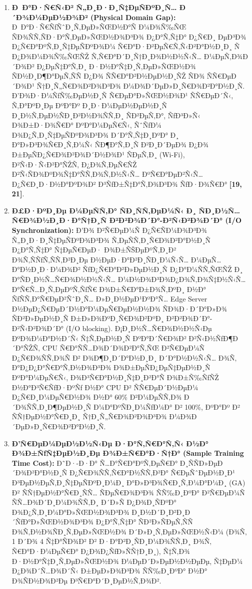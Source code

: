 \documentclass[]{article}
\begin{document}
\begin{enumerate}
\def\labelenumi{\arabic{enumi}.}
\item
  \textbf{Ð Ð°Ð·Ñ€Ñ‹Ð² Ñ„Ð¸Ð·Ð¸Ñ‡ÐµÑÐºÐ¸Ñ… Ð´Ð¾Ð¼ÐµÐ½Ð¾Ð² (Physical Domain Gap):} Ð Ð°Ð·Ñ€ÑƒÑˆÐ¸Ñ‚ÐµÐ»ÑŒÐ½Ð°Ñ Ð¼Ð¾Ñ‰ÑŒ ÑÐ¾ÑÑ‚ÑÐ·Ð°Ñ‚ÐµÐ»ÑŒÐ½Ð¾Ð³Ð¾ Ð¿Ð°Ñ‚Ñ‡Ð° Ð¿Ñ€Ð¸ ÐµÐ³Ð¾ Ð¿Ñ€Ð°ÐºÑ‚Ð¸Ñ‡ÐµÑÐºÐ¾Ð¼ Ñ€Ð°Ð·Ð²ÐµÑ€Ñ‚Ñ‹Ð²Ð°Ð½Ð¸Ð¸ Ñ Ð¿Ð¾Ð¼Ð¾Ñ‰ÑŒÑŽ Ñ‚Ñ€Ð°Ð´Ð¸Ñ†Ð¸Ð¾Ð½Ð½Ñ‹Ñ… Ð¼ÐµÑ‚Ð¾Ð´Ð¾Ð² Ð¿ÐµÑ‡Ð°Ñ‚Ð¸ Ð·Ð½Ð°Ñ‡Ð¸Ñ‚ÐµÐ»ÑŒÐ½Ð¾ ÑÐ½Ð¸Ð¶Ð°ÐµÑ‚ÑÑ Ð¿Ð¾ ÑÑ€Ð°Ð²Ð½ÐµÐ½Ð¸ÑŽ ÑÐ¾ ÑÑ€ÐµÐ´Ð¾Ð¹ Ñ†Ð¸Ñ„Ñ€Ð¾Ð²Ð¾Ð³Ð¾ Ð¼Ð¾Ð´ÐµÐ»Ð¸Ñ€Ð¾Ð²Ð°Ð½Ð¸Ñ. Ð’Ð¾Ð·Ð¼ÑƒÑ‰ÐµÐ½Ð¸Ñ Ñ€ÐµÐ°Ð»ÑŒÐ½Ð¾Ð¹ ÑÑ€ÐµÐ´Ñ‹, Ñ‚Ð°ÐºÐ¸Ðµ ÐºÐ°Ðº Ð¸Ð·Ð¼ÐµÐ½ÐµÐ½Ð¸Ñ Ð¸Ð½Ñ‚ÐµÐ½ÑÐ¸Ð²Ð½Ð¾ÑÑ‚Ð¸ ÑÐ²ÐµÑ‚Ð°, ÑƒÐ³Ð»Ñ‹ Ð¾Ð±Ð·Ð¾Ñ€Ð° ÐºÐ°Ð¼ÐµÑ€Ñ‹, ÑˆÑƒÐ¼ Ð¾Ð¿Ñ‚Ð¸Ñ‡ÐµÑÐºÐ¾Ð³Ð¾ Ð´Ð°Ñ‚Ñ‡Ð¸ÐºÐ° Ð¸ Ð°Ð»Ð³Ð¾Ñ€Ð¸Ñ‚Ð¼Ñ‹ ÑÐ¶Ð°Ñ‚Ð¸Ñ Ð²Ð¸Ð´ÐµÐ¾ Ð¿Ð¾ Ð±ÐµÑÐ¿Ñ€Ð¾Ð²Ð¾Ð´Ð½Ð¾Ð¹ ÑÐµÑ‚Ð¸ (Wi-Fi), Ð²Ñ‹Ð·Ñ‹Ð²Ð°ÑŽÑ‚ Ð¿Ð¾Ñ‚ÐµÑ€ÑŽ Ð²Ñ‹ÑÐ¾ÐºÐ¾Ñ‡Ð°ÑÑ‚Ð¾Ñ‚Ð½Ñ‹Ñ… ÐºÑ€Ð°ÐµÐ²Ñ‹Ñ… Ð¿Ñ€Ð¸Ð·Ð½Ð°ÐºÐ¾Ð² Ð³ÑƒÐ±Ñ‡Ð°Ñ‚Ð¾Ð³Ð¾ ÑƒÐ·Ð¾Ñ€Ð° \textbf{{[}19, 21{]}}.
\item
  \textbf{Ð£Ð·ÐºÐ¸Ðµ Ð¼ÐµÑÑ‚Ð° ÑÐ¸ÑÑ‚ÐµÐ¼Ñ‹ Ð¸ ÑÐ¸Ð½Ñ…Ñ€Ð¾Ð½Ð¸Ð·Ð°Ñ†Ð¸Ñ Ð²Ð²Ð¾Ð´Ð°-Ð²Ñ‹Ð²Ð¾Ð´Ð° (I/O Synchronization):} Ð’Ð¾ Ð²Ñ€ÐµÐ¼Ñ Ð¿Ñ€ÑÐ¼Ð¾Ð³Ð¾ Ñ„Ð¸Ð·Ð¸Ñ‡ÐµÑÐºÐ¾Ð³Ð¾ Ñ‚ÐµÑÑ‚Ð¸Ñ€Ð¾Ð²Ð°Ð½Ð¸Ñ Ð¿Ð°Ñ‚Ñ‡Ð° Ñ‡ÐµÑ€ÐµÐ· Ð¾Ð±ÑŠÐµÐºÑ‚Ð¸Ð² Ð¾Ñ‚ÑÑƒÑ‚ÑÑ‚Ð²Ð¸Ðµ Ð½ÐµÐ·Ð°Ð²Ð¸ÑÐ¸Ð¼Ñ‹Ñ… Ð¼ÐµÑ…Ð°Ð½Ð¸Ð·Ð¼Ð¾Ð² ÑƒÐ¿Ñ€Ð°Ð²Ð»ÐµÐ½Ð¸Ñ Ð¿Ð°Ð¼ÑÑ‚ÑŒÑŽ Ð¸ Ð°ÑÐ¸Ð½Ñ…Ñ€Ð¾Ð½Ð½Ñ‹Ñ… Ð¼Ð½Ð¾Ð³Ð¾Ð¿Ð¾Ñ‚Ð¾Ñ‡Ð½Ñ‹Ñ… Ð°Ñ€Ñ…Ð¸Ñ‚ÐµÐºÑ‚ÑƒÑ€ Ð¾Ð±Ñ€Ð°Ð±Ð¾Ñ‚ÐºÐ¸ Ð½Ð° ÑƒÑÑ‚Ð°Ñ€ÐµÐ²ÑˆÐ¸Ñ… Ð»Ð¸Ð½ÐµÐ¹ÐºÐ°Ñ… Edge Server Ð½ÐµÐ¿Ñ€ÐµÐ´Ð½Ð°Ð¼ÐµÑ€ÐµÐ½Ð½Ð¾ ÑÐ¾Ð·Ð´Ð°Ð»Ð¾ ÑÐ²Ð»ÐµÐ½Ð¸Ñ Ð±Ð»Ð¾ÐºÐ¸Ñ€Ð¾Ð²ÐºÐ¸ Ð²Ð²Ð¾Ð´Ð°-Ð²Ñ‹Ð²Ð¾Ð´Ð° (I/O blocking). Ð¡Ð¸Ð½Ñ…Ñ€Ð¾Ð½Ð½Ñ‹Ðµ ÐºÐ¾Ð¼Ð°Ð½Ð´Ñ‹ Ñ‡Ñ‚ÐµÐ½Ð¸Ñ ÐºÐ°Ð´Ñ€Ð¾Ð² Ð²Ñ‹Ð½ÑƒÐ¶Ð´Ð°ÑŽÑ‚ CPU Ñ€Ð°ÑÑ…Ð¾Ð´Ð¾Ð²Ð°Ñ‚ÑŒ Ð²Ñ€ÐµÐ¼Ñ Ð¿Ñ€Ð¾ÑÑ‚Ð¾Ñ Ð² Ð¾Ð¶Ð¸Ð´Ð°Ð½Ð¸Ð¸ Ð´Ð°Ð½Ð½Ñ‹Ñ… Ð¾Ñ‚ Ð°Ð¿Ð¿Ð°Ñ€Ð°Ñ‚Ð½Ð¾Ð³Ð¾ Ð¾Ð±ÐµÑÐ¿ÐµÑ‡ÐµÐ½Ð¸Ñ ÐºÐ°Ð¼ÐµÑ€Ñ‹, Ð¾Ð³Ñ€Ð°Ð½Ð¸Ñ‡Ð¸Ð²Ð°Ñ Ð¾Ð±Ñ‰ÑƒÑŽ Ð½Ð°Ð³Ñ€ÑƒÐ·ÐºÑƒ Ð½Ð° CPU Ð² ÑÑ€ÐµÐ´Ð½ÐµÐ¼ Ð¿Ñ€Ð¸Ð¼ÐµÑ€Ð½Ð¾ Ð½Ð° 60\% Ð²Ð¼ÐµÑÑ‚Ð¾ Ð´Ð¾ÑÑ‚Ð¸Ð¶ÐµÐ½Ð¸Ñ Ð¼Ð°ÐºÑÐ¸Ð¼ÑƒÐ¼Ð° Ð² 100\%, ÐºÐ°Ðº Ð² ÑÑ†ÐµÐ½Ð°Ñ€Ð¸Ð¸ Ñ†Ð¸Ñ„Ñ€Ð¾Ð²Ð¾Ð³Ð¾ Ð¼Ð¾Ð´ÐµÐ»Ð¸Ñ€Ð¾Ð²Ð°Ð½Ð¸Ñ.
\item
  \textbf{Ð’Ñ€ÐµÐ¼ÐµÐ½Ð½Ñ‹Ðµ Ð·Ð°Ñ‚Ñ€Ð°Ñ‚Ñ‹ Ð½Ð° Ð¾Ð±ÑƒÑ‡ÐµÐ½Ð¸Ðµ Ð¾Ð±Ñ€Ð°Ð·Ñ†Ð° (Sample Training Time Cost):} Ð˜Ð·-Ð·Ð° Ñ…Ð°Ñ€Ð°ÐºÑ‚ÐµÑ€Ð° Ð¸ÑÑÐ»ÐµÐ´Ð¾Ð²Ð°Ð½Ð¸Ñ Ð¿Ñ€Ð¾ÑÑ‚Ñ€Ð°Ð½ÑÑ‚Ð²Ð° Ñ€ÐµÑˆÐµÐ½Ð¸Ð¹ Ð³ÐµÐ½ÐµÑ‚Ð¸Ñ‡ÐµÑÐºÐ¸Ð¼Ð¸ Ð°Ð»Ð³Ð¾Ñ€Ð¸Ñ‚Ð¼Ð°Ð¼Ð¸ (GA) Ð² ÑÑ†ÐµÐ½Ð°Ñ€Ð¸ÑÑ… ÑÐµÑ€Ð¾Ð³Ð¾ ÑÑ‰Ð¸ÐºÐ° Ð²Ñ€ÐµÐ¼Ñ ÑÑ…Ð¾Ð´Ð¸Ð¼Ð¾ÑÑ‚Ð¸ Ð´Ð»Ñ Ð¿Ð¾Ð¸ÑÐºÐ° Ð¾Ð¿Ñ‚Ð¸Ð¼Ð°Ð»ÑŒÐ½Ð¾Ð³Ð¾ Ð¸Ð½Ð´Ð¸Ð²Ð¸Ð´ÑƒÐ°Ð»ÑŒÐ½Ð¾Ð³Ð¾ Ð¿Ð°Ñ‚Ñ‡Ð° ÑÐ²Ð»ÑÐµÑ‚ÑÑ Ð¾Ñ‚Ð½Ð¾ÑÐ¸Ñ‚ÐµÐ»ÑŒÐ½Ð¾ Ð´Ð»Ð¸Ñ‚ÐµÐ»ÑŒÐ½Ñ‹Ð¼ (Ð¾Ñ‚ 1 Ð´Ð¾ 4 Ñ‡Ð°ÑÐ¾Ð² Ð² Ð·Ð°Ð²Ð¸ÑÐ¸Ð¼Ð¾ÑÑ‚Ð¸ Ð¾Ñ‚ Ñ€Ð°Ð·Ð¼ÐµÑ€Ð° Ð¿Ð¾Ð¿ÑƒÐ»ÑÑ†Ð¸Ð¸), Ñ‡Ñ‚Ð¾ Ð·Ð½Ð°Ñ‡Ð¸Ñ‚ÐµÐ»ÑŒÐ½Ð¾ Ð¼ÐµÐ´Ð»ÐµÐ½Ð½ÐµÐµ, Ñ‡ÐµÐ¼ Ð¿Ð¾Ð´Ñ…Ð¾Ð´Ñ‹ Ð±ÐµÐ»Ð¾Ð³Ð¾ ÑÑ‰Ð¸ÐºÐ° Ð½Ð° Ð¾ÑÐ½Ð¾Ð²Ðµ Ð³Ñ€Ð°Ð´Ð¸ÐµÐ½Ñ‚Ð¾Ð².
\end{enumerate}
\end{document}
